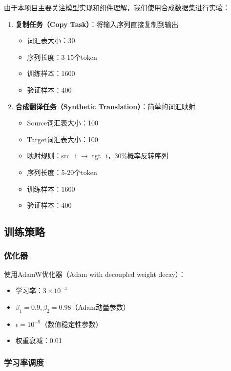\documentclass[UTF8,12pt,a4paper]{ctexart}
\begin{document}
由于本项目主要关注模型实现和组件理解，我们使用合成数据集进行实验：

\begin{enumerate}
    \item \textbf{复制任务（Copy Task）}：将输入序列直接复制到输出
    \begin{itemize}
        \item 词汇表大小：30
        \item 序列长度：3-15个token
        \item 训练样本：1600
        \item 验证样本：400
    \end{itemize}
    
    \item \textbf{合成翻译任务（Synthetic Translation）}：简单的词汇映射
    \begin{itemize}
        \item Source词汇表大小：100
        \item Target词汇表大小：100
        \item 映射规则：src\_i $\to$ tgt\_i，30\%概率反转序列
        \item 序列长度：5-20个token
        \item 训练样本：1600
        \item 验证样本：400
    \end{itemize}
\end{enumerate}

\subsection{训练策略}

\subsubsection{优化器}

使用AdamW优化器（Adam with decoupled weight decay）：

\begin{itemize}
    \item 学习率：$3 \times 10^{-4}$
    \item $\beta_1 = 0.9, \beta_2 = 0.98$（Adam动量参数）
    \item $\epsilon = 10^{-9}$（数值稳定性参数）
    \item 权重衰减：0.01
\end{itemize}

\subsubsection{学习率调度}
\end{document}
